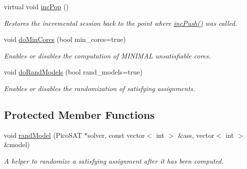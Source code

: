 \begin{DoxyCompactItemize}
virtual void \hyperlink{classPicoSatApi_a045c7a5229d4e45095922e1315c5c282}{inc\-Pop} ()
\begin{DoxyCompactList}\small\item\em Restores the incremental session back to the point where \hyperlink{classPicoSatApi_a523f9de3a59f927cb6ad0729e1caaac7}{inc\-Push()} was called. \end{DoxyCompactList}\item 
void \hyperlink{classSatSolver_a159fc9658709e5aeba2844a09454b2cb}{do\-Min\-Cores} (bool min\-\_\-cores=true)
\begin{DoxyCompactList}\small\item\em Enables or disables the computation of M\-I\-N\-I\-M\-A\-L unsatisfiable cores. \end{DoxyCompactList}\item 
void \hyperlink{classSatSolver_ae229c5e277350710412fce0e867dc566}{do\-Rand\-Models} (bool rand\-\_\-models=true)
\begin{DoxyCompactList}\small\item\em Enables or disables the randomization of satisfying assignments. \end{DoxyCompactList}\end{DoxyCompactItemize}
\subsection*{Protected Member Functions}
\begin{DoxyCompactItemize}
\item 
void \hyperlink{classPicoSatApi_ab0ded3e44578129ae266936de5e29a1c}{rand\-Model} (Pico\-S\-A\-T $\ast$solver, const vector$<$ int $>$ \&ass, vector$<$ int $>$ \&model)
\begin{DoxyCompactList}\small\item\em A helper to randomize a satisfying assignment after it has been computed. \end{DoxyCompactList}\end{DoxyCompactItemize}
